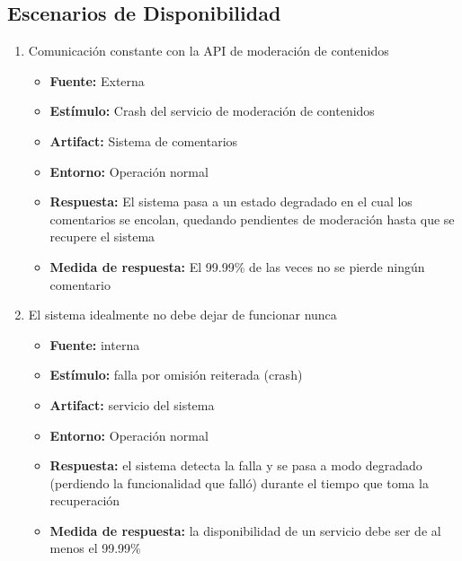 \subsection{Escenarios de Disponibilidad}
\begin{enumerate}
  \item Comunicación constante con la API de moderación de contenidos 
  \begin{itemize}
    \item \textbf{Fuente:} Externa
    \item \textbf{Estímulo:} Crash del servicio de moderación de contenidos
    \item \textbf{Artifact:} Sistema de comentarios
    \item \textbf{Entorno:} Operación normal
    \item \textbf{Respuesta:} El sistema pasa a un estado degradado en el cual los comentarios se encolan, quedando pendientes de moderación hasta que se recupere el sistema
    \item \textbf{Medida de respuesta:} El 99.99\% de las veces no se pierde ningún comentario
  \end{itemize}

  \item El sistema idealmente no debe dejar de funcionar nunca
  \begin{itemize} 
    \item \textbf{Fuente:} interna
    \item \textbf{Estímulo:} falla por omisión reiterada (crash) 
    \item \textbf{Artifact:} servicio del sistema
    \item \textbf{Entorno:} Operación normal
    \item \textbf{Respuesta:} el sistema detecta la falla y se pasa a modo degradado (perdiendo la funcionalidad que falló) durante el tiempo que toma la recuperación
    \item \textbf{Medida de respuesta:} la disponibilidad de un servicio debe ser de al menos el 99.99\%
  \end{itemize}
\end{enumerate}

